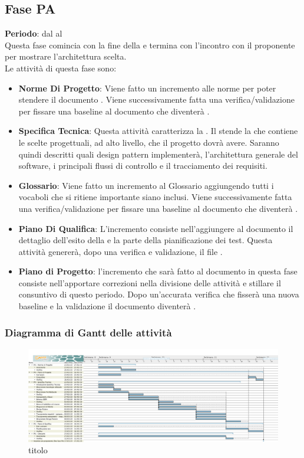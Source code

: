 \subsection{Fase PA}
	\textbf{Periodo}: dal  al  \\Questa fase comincia con la fine della  e termina con l'incontro con il proponente per mostrare l'architettura scelta. \\Le attività di questa fase sono:
	\begin{itemize}
		\item \textbf{Norme Di Progetto}: Viene fatto un incremento alle norme per poter stendere il documento . Viene successivamente fatta una verifica/validazione per fissare una baseline al documento che diventerà .
		\item \textbf{Specifica Tecnica}: Questa attività caratterizza la . Il  stende la  che contiene le scelte progettuali, ad alto livello, che il progetto dovrà avere. Saranno quindi descritti quali design pattern \projectname{} implementerà, l'architettura generale del software, i principali flussi di controllo e il tracciamento dei requisiti.
		\item \textbf{Glossario}: Viene fatto un incremento al Glossario aggiungendo tutti i vocaboli che si ritiene importante siano inclusi. Viene successivamente fatta una verifica/validazione per fissare una baseline al documento che diventerà .
		\item \textbf{Piano Di Qualifica}: L'incremento consiste nell'aggiungere al documento  il dettaglio dell'esito della  e la parte della pianificazione dei test. Questa attività genererà, dopo una verifica e validazione, il file .
		\item \textbf{Piano di Progetto}: l'incremento che sarà fatto al documento  in questa fase consiste nell'apportare correzioni nella divisione delle attività e stillare il consuntivo di questo periodo. Dopo un'accurata verifica che fisserà una nuova baseline e la validazione il documento diventerà .
	\end{itemize}
	\subsubsection{Diagramma di Gantt delle attività}
	\begin{figure}\centering
		\includegraphics[scale=0.27]{PianoDiProgetto/Pics/FasePA.png}
	\caption{titolo}
\end{figure}
